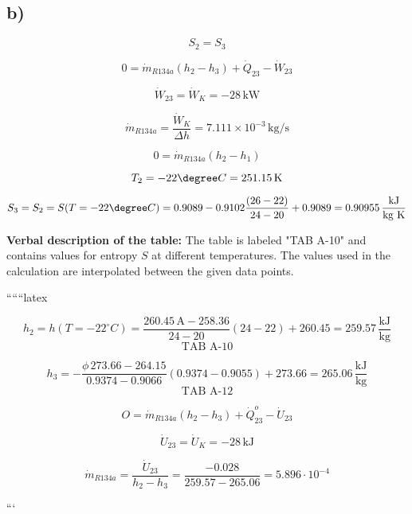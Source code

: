 

\subsection*{b)}

\[
S_2 = S_3
\]

\[
0 = \dot{m}_{R134a} (h_2 - h_3) + \dot{Q}_{23} - \dot{W}_{23}
\]

\[
\dot{W}_{23} = \dot{W}_K = -28 \, \text{kW}
\]

\[
\dot{m}_{R134a} = \frac{\dot{W}_K}{\Delta h} = 7.111 \times 10^{-3} \, \text{kg/s}
\]

\[
0 = \dot{m}_{R134a} (h_2 - h_1)
\]

\[
T_2 = -22 \degree C = 251.15 \, \text{K}
\]

\[
S_3 = S_2 = S(T = -22 \degree C) = 0.9089 - 0.9102 \frac{(26 - 22)}{24 - 20} + 0.9089 = 0.90955 \, \frac{\text{kJ}}{\text{kg K}}
\]

\textbf{Verbal description of the table:} The table is labeled "TAB A-10" and contains values for entropy \( S \) at different temperatures. The values used in the calculation are interpolated between the given data points.

``````latex


\[
h_2 = h\left(T = -22^\circ C\right) = \frac{260.45 \, \text{A} - 258.36}{24 - 20} (24 - 22) + 260.45 = 259.57 \, \frac{\text{kJ}}{\text{kg}}
\]
\[
\text{TAB A-10}
\]

\[
h_3 = -\frac{\phi \, 273.66 - 264.15}{0.9374 - 0.9066} (0.9374 - 0.9055) + 273.66 = 265.06 \, \frac{\text{kJ}}{\text{kg}}
\]
\[
\text{TAB A-12}
\]

\[
O = \dot{m}_{R134a} \left( h_2 - h_3 \right) + \dot{Q}_{23}^o - \dot{U}_{23}
\]

\[
\dot{U}_{23} = \dot{U}_K = -28 \, \text{kJ}
\]

\[
\dot{m}_{R134a} = \frac{\dot{U}_{23}}{h_2 - h_3} = \frac{-0.028}{259.57 - 265.06} = 5.896 \cdot 10^{-4}
\]

```